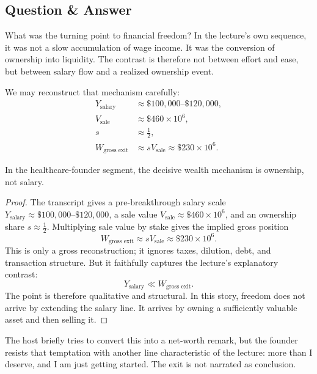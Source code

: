 \subsection{Question \& Answer}

What was the turning point to financial freedom? In the lecture's own sequence, it was not a slow accumulation of wage income. It was the conversion of ownership into liquidity. The contrast is therefore not between effort and ease, but between salary flow and a realized ownership event.

We may reconstruct that mechanism carefully:
\begin{align}
Y_{\text{salary}} &\approx \$100{,}000\text{--}\$120{,}000,\\
V_{\text{sale}} &\approx \$460\times 10^6,\\
s &\approx \tfrac12,\\
W_{\text{gross exit}} &\approx sV_{\text{sale}} \approx \$230\times 10^6.
\end{align}

\begin{proposition}
In the healthcare-founder segment, the decisive wealth mechanism is ownership, not salary.
\end{proposition}

\begin{proof}
The transcript gives a pre-breakthrough salary scale \(Y_{\text{salary}} \approx \$100{,}000\text{--}\$120{,}000\), a sale value \(V_{\text{sale}} \approx \$460\times 10^6\), and an ownership share \(s \approx \tfrac12\). Multiplying sale value by stake gives the implied gross position
\[
W_{\text{gross exit}} \approx sV_{\text{sale}} \approx \$230\times 10^6.
\]
This is only a gross reconstruction; it ignores taxes, dilution, debt, and transaction structure. But it faithfully captures the lecture's explanatory contrast:
\[
Y_{\text{salary}} \ll W_{\text{gross exit}}.
\]
The point is therefore qualitative and structural. In this story, freedom does not arrive by extending the salary line. It arrives by owning a sufficiently valuable asset and then selling it.
\end{proof}

The host briefly tries to convert this into a net-worth remark, but the founder resists that temptation with another line characteristic of the lecture: more than I deserve, and I am just getting started. The exit is not narrated as conclusion.

